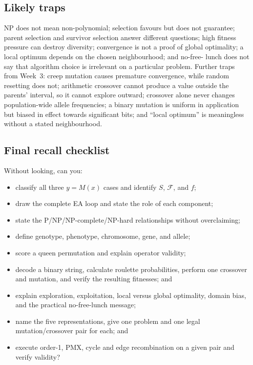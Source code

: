 \documentclass[11pt,a4paper]{article}
\begin{document}
\subsection{Likely traps}
NP does not mean non-polynomial; selection favours but does not guarantee;
parent selection and survivor selection answer different questions; high
fitness pressure can destroy diversity; convergence is not a proof of global
optimality; a local optimum depends on the chosen neighbourhood; and no-free-
lunch does not say that algorithm choice is irrelevant on a particular
problem. Further traps from Week~3: creep mutation causes premature
convergence, while random resetting does not; arithmetic crossover cannot
produce a value outside the parents' interval, so it cannot explore outward;
crossover alone never changes population-wide allele frequencies; a binary
mutation is uniform in application but biased in effect towards significant
bits; and ``local optimum'' is meaningless without a stated neighbourhood.

\subsection{Final recall checklist}
Without looking, can you:
\begin{itemize}[leftmargin=*,nosep]
  \item classify all three $y=M(x)$ cases and identify $S$, $\mathcal F$, and
        $f$;
  \item draw the complete EA loop and state the role of each component;
  \item state the P/NP/NP-complete/NP-hard relationships without overclaiming;
  \item define genotype, phenotype, chromosome, gene, and allele;
  \item score a queen permutation and explain operator validity;
  \item decode a binary string, calculate roulette probabilities, perform one
        crossover and mutation, and verify the resulting fitnesses; and
  \item explain exploration, exploitation, local versus global optimality,
        domain bias, and the practical no-free-lunch message;
  \item name the five representations, give one problem and one legal
        mutation/crossover pair for each; and
  \item execute order-1, PMX, cycle and edge recombination on a given pair and
        verify validity?
\end{itemize}
\end{document}
